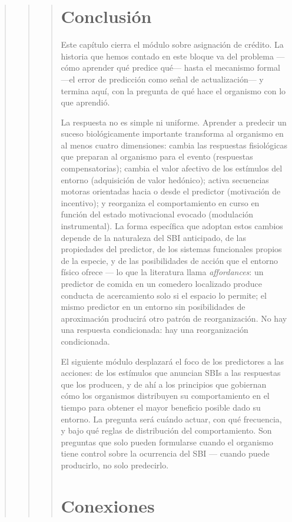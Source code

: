 \documentclass[
  letterpaper,
  DIV=11,
  numbers=noendperiod]{scrreprt}
\begin{document}
\begin{tcolorbox}[enhanced jigsaw, toprule=.15mm, arc=.35mm, colback=white, opacityback=0, colframe=quarto-callout-note-color-frame, breakable, rightrule=.15mm, left=2mm, leftrule=.75mm, bottomrule=.15mm]
\begin{quote}
\begin{quote}
\begin{quote}
\section{Conclusión}\label{conclusiuxf3n-1}

Este capítulo cierra el módulo sobre asignación de crédito. La historia
que hemos contado en este bloque va del problema ---cómo aprender qué
predice qué--- hasta el mecanismo formal ---el error de predicción como
señal de actualización--- y termina aquí, con la pregunta de qué hace el
organismo con lo que aprendió.

La respuesta no es simple ni uniforme. Aprender a predecir un suceso
biológicamente importante transforma al organismo en al menos cuatro
dimensiones: cambia las respuestas fisiológicas que preparan al
organismo para el evento (respuestas compensatorias); cambia el valor
afectivo de los estímulos del entorno (adquisición de valor hedónico);
activa secuencias motoras orientadas hacia o desde el predictor
(motivación de incentivo); y reorganiza el comportamiento en curso en
función del estado motivacional evocado (modulación instrumental). La
forma específica que adoptan estos cambios depende de la naturaleza del
SBI anticipado, de las propiedades del predictor, de los sistemas
funcionales propios de la especie, y de las posibilidades de acción que
el entorno físico ofrece --- lo que la literatura llama
\emph{affordances}: un predictor de comida en un comedero localizado
produce conducta de acercamiento solo si el espacio lo permite; el mismo
predictor en un entorno sin posibilidades de aproximación producirá otro
patrón de reorganización. No hay una respuesta condicionada: hay una
reorganización condicionada.

El siguiente módulo desplazará el foco de los predictores a las
acciones: de los estímulos que anuncian SBIs a las respuestas que los
producen, y de ahí a los principios que gobiernan cómo los organismos
distribuyen su comportamiento en el tiempo para obtener el mayor
beneficio posible dado su entorno. La pregunta será cuándo actuar, con
qué frecuencia, y bajo qué reglas de distribución del comportamiento.
Son preguntas que solo pueden formularse cuando el organismo tiene
control sobre la ocurrencia del SBI --- cuando puede producirlo, no solo
predecirlo.

\section{Conexiones}\label{conexiones-5}


\end{quote}
\end{quote}
\end{quote}
\end{tcolorbox}
\end{document}
